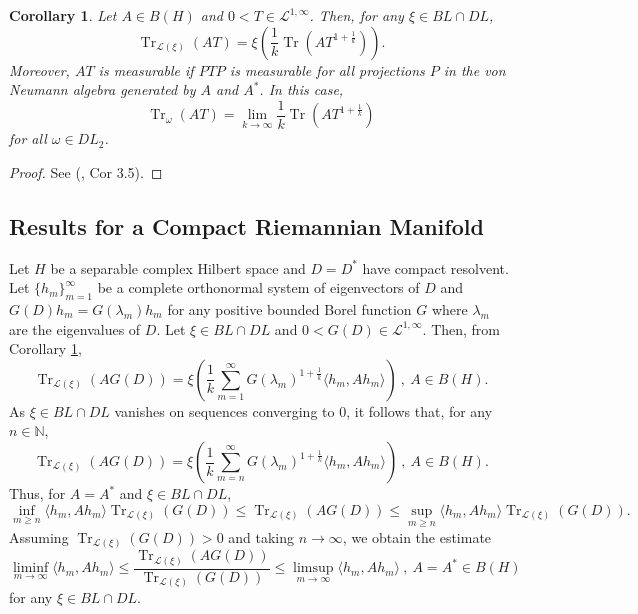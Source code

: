 \documentclass[final,1p]{elsarticle}
\numberwithin{equation}{section}
\theoremstyle{plain}
\newtheorem{cor}[thm]{Corollary}
\theoremstyle{definition}
\begin{document}
\begin{cor} \label{cor:resA}
Let $A \in B(H)$ and $0 < T \in \mathcal{L}^{1,\infty}$.
Then, for any ${\ensuremath{\xi}} \in BL \cap DL$,
$$
\operatorname{Tr}_{\mathcal{L}({\ensuremath{\xi}})}(AT) = {\ensuremath{\xi}} \left( \frac 1k \operatorname{Tr}(AT^{1+\frac 1k}) \right) .
$$
Moreover, $AT$ is measurable if $PTP$ is measurable for all  projections $P$ in the von Neumann algebra generated by $A$ and $A^*$. In this case,
$$
\operatorname{Tr}_{\omega}(AT) = \lim_{k \to \infty} \frac 1k \operatorname{Tr}(AT^{1+\frac 1k})
$$
for all $\omega \in DL_2$.
\end{cor}
\begin{proof}
See (\cite{LS2}, Cor 3.5).
\end{proof}

\subsection{Results for a Compact Riemannian Manifold} \label{sec:2.5}
 
\medskip Let $H$ be a separable complex Hilbert space and $D=D^*$ have compact resolvent.
Let $\{ h_m \}_{m=1}^\infty$ be a complete orthonormal system of eigenvectors of $D$
and $G(D)h_m = G(\lambda_m)h_m$ for any positive bounded Borel function $G$ where $\lambda_m$ are the eigenvalues of $D$.
Let ${\ensuremath{\xi}} \in BL \cap DL$ and $0 < G(D) \in \mathcal{L}^{1,\infty}$.  Then, from Corollary \ref{cor:resA},
$$
\operatorname{Tr}_{\mathcal{L}({\ensuremath{\xi}})}(AG(D)) = {\ensuremath{\xi}} \left( \frac 1k \sum_{m=1}^\infty G(\lambda_m)^{1+\frac 1k} {\ensuremath{\langle {h_m} , {Ah_m} \rangle}} \right) \ , \ A \in B(H) .
$$
As ${\ensuremath{\xi}} \in BL \cap DL$ vanishes on sequences converging to $0$, it follows that, for any $n \in {\ensuremath{\mathbb{N}}}$,
$$
\operatorname{Tr}_{\mathcal{L}({\ensuremath{\xi}})}(AG(D)) = {\ensuremath{\xi}} \left( \frac 1k \sum_{m=n}^\infty G(\lambda_m)^{1+\frac 1k} {\ensuremath{\langle {h_m} , {Ah_m} \rangle}} \right) \ , \ A \in B(H) .
$$
Thus, for $A=A^*$ and ${\ensuremath{\xi}} \in BL \cap DL$,
$$
\inf_{m \geq n} {\ensuremath{\langle {h_m} , {Ah_m} \rangle}} \operatorname{Tr}_{\mathcal{L}({\ensuremath{\xi}})}(G(D)) \leq
\operatorname{Tr}_{\mathcal{L}({\ensuremath{\xi}})}(AG(D)) \leq \sup_{m \geq n} {\ensuremath{\langle {h_m} , {Ah_m} \rangle}} \operatorname{Tr}_{\mathcal{L}({\ensuremath{\xi}})}(G(D)) .
$$
Assuming $\operatorname{Tr}_{\mathcal{L}({\ensuremath{\xi}})}(G(D)) > 0$ and taking $n \to \infty$, we obtain the estimate
\begin{equation} \label{eq:estn}
\liminf_{m \to \infty} {\ensuremath{\langle {h_m} , {Ah_m} \rangle}} \leq
\frac{\operatorname{Tr}_{\mathcal{L}({\ensuremath{\xi}})}(AG(D))}{\operatorname{Tr}_{\mathcal{L}({\ensuremath{\xi}})}(G(D))}
 \leq \limsup_{m \to \infty} {\ensuremath{\langle {h_m} , {Ah_m} \rangle}}
 \ , \ A=A^* \in B(H)
\end{equation}
for any ${\ensuremath{\xi}} \in BL \cap DL$.
\end{document}
